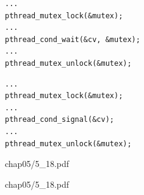 \documentclass{article}
\newcommand{\myfigsp}[3]{\newpage\begin{overpic}[scale=#1,page=#2]{#3}}
\newcommand{\myfigend}{\end{overpic}}
\begin{document}
\begin{multicols}{2}
\begin{Verbatim}[label=Thread 0]
...
pthread_mutex_lock(&mutex);
...
pthread_cond_wait(&cv, &mutex);
...
pthread_mutex_unlock(&mutex);
\end{Verbatim}
\begin{Verbatim}[label=Thread 1]
...
pthread_mutex_lock(&mutex);
...
pthread_cond_signal(&cv);
...
pthread_mutex_unlock(&mutex);
\end{Verbatim}
\end{multicols}


\newpage
\myfigsp{.9}{1}{chap05/5_18.pdf}
\myfigend
\myfigsp{.9}{2}{chap05/5_18.pdf}
\myfigend
\end{document}
